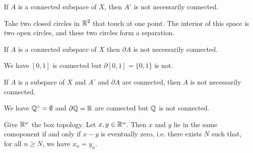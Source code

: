 \begin{example}
    If $A$ is a connected subspace of $X$, then $A^\circ$ is not necessarily connected.

    Take two closed circles in $\mathbb{R}^2$ that touch at one point. The interior of this space is
    two open circles, and these two circles form a separation.
\end{example}

\begin{example}
    If $A$ is a connected subspace of $X$ then $\partial A$ is not necessarily connected.

    We have $[0,1]$ is connected but $\partial [0,1] = \{ 0, 1 \}$ is not.
\end{example}

\begin{example}
    If $A$ is a subspace of $X$ and $A^\circ$ and $\partial A$ are connected, then $A$ is not necessarily connected.

    We have $\mathbb{Q}^\circ = \emptyset$ and $\partial \mathbb{Q} = \mathbb{R}$ are connected but $\mathbb{Q}$ is not connected.
\end{example}

\begin{proposition}
    Give $\mathbb{R}^\omega$ the box topology. Let $x, y \in \mathbb{R}^\omega$. Then $x$ and $y$ lie in the same comoponent if and only if $x-y$ is eventually zero, i.e.
    there exists $N$ such that, for all $n \geq N$,
    we have $x_n = y_n$.
\end{proposition}

